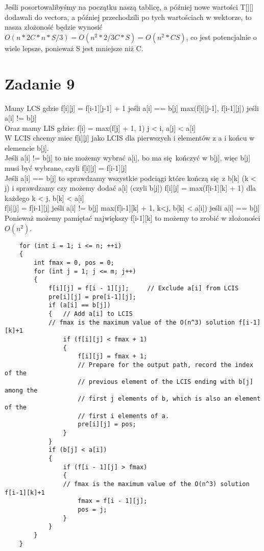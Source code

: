 \documentclass[12pt]{article}
\begin{document}
Jeśli posortowalibyśmy na początku naszą tablicę, a później nowe wartości T[][] dodawali do vectora, a później przechodzili po tych wartościach w wektorze, to nasza złożoność będzie wynosić $O(n * 2C*n*S/3) = O(n^2 * 2/3C*S) = O(n^2 * CS)$, co jest potencjalnie o wiele lepsze, ponieważ S jest mniejsze niż C. 

\section{Zadanie 9}

Mamy LCS gdzie 
f[i][j] = f[i-1][j-1] + 1 jeśli a[i] == b[j]
          max(f[i][j-1], f[i-1][j]) jeśli a[i] != b[j]\\

Oraz mamy LIS gdzie:
f[i] = max(f[j] + 1, 1) j < i, a[j] < a[i]\\

W LCIS chcemy miec f[i][j] jako LCIS dla pierwszych i elementów z a i końcu w elemencie b[j].\\

Jeśli a[i] != b[j] to nie możemy wybrać a[i], bo ma się kończyć w b[j], więc b[j] musi być wybrane, czyli 
f[i][j] = f[i-1][j]\\

Jeśli a[i] == b[j] to sprawdzamy wszystkie podciągi które kończą się z b[k] (k < j) i sprawdzamy czy możemy dodać a[i] (czyli b[j])
f[i][j] = max(f[i-1][k] + 1) dla każdego k < j, b[k] < a[i]\\


f[i][j] = f[i-1][j] jeśli a[i] != b[j]
max(f[i-1][k] + 1, k<j, b[k] < a[i]) jeśli a[i] == b[j]\\

Ponieważ możemy pamiętać największy f[i-1][k] to możemy to zrobić w złożoności $O(n^2)$.\\

\begin{lstlisting}
    for (int i = 1; i <= n; ++i)
    {
        int fmax = 0, pos = 0;
        for (int j = 1; j <= m; j++)
        {
            f[i][j] = f[i - 1][j];     // Exclude a[i] from LCIS
            pre[i][j] = pre[i-1][j];
            if (a[i] == b[j])
            {   // Add a[i] to LCIS
            // fmax is the maximum value of the O(n^3) solution f[i-1][k]+1
                if (f[i][j] < fmax + 1) 
                {
                    f[i][j] = fmax + 1;
                    // Prepare for the output path, record the index of the 
                    // previous element of the LCIS ending with b[j] among the
                    // first j elements of b, which is also an element of the 
                    // first i elements of a.
                    pre[i][j] = pos;  
                }
            }
            if (b[j] < a[i])
            {
                if (f[i - 1][j] > fmax)
                {
                // fmax is the maximum value of the O(n^3) solution f[i-1][k]+1
                    fmax = f[i - 1][j]; 
                    pos = j;
                }
            }
        }
    }
\end{lstlisting}
\end{document}
